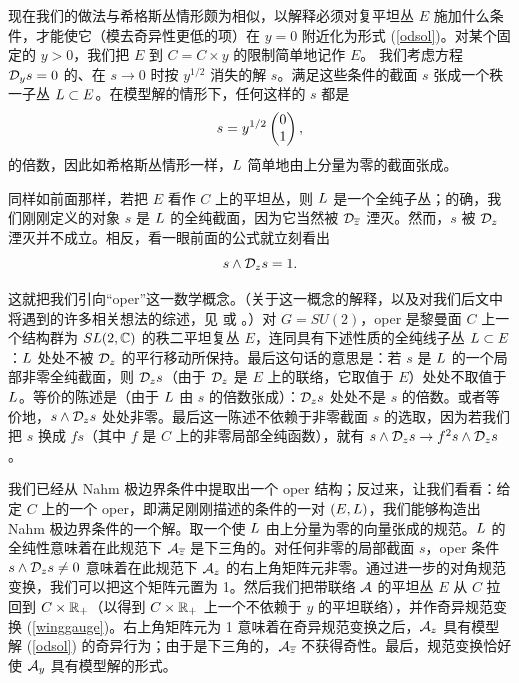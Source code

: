 现在我们的做法与希格斯丛情形颇为相似，以解释必须对复平坦丛 $E$ 施加什么条件，才能使它（模去奇异性更低的项）在 $y=0$ 附近化为形式 (\ref{odsol})。对某个固定的 $y>0$，我们把 $E$ 到 $C=C\times y$ 的限制简单地记作 $E$。
 我们考虑方程 ${\mathcal D}_ys=0$ 的、在 $s\to 0$ 时按 $y^{1/2}$ 消失的解 $s$。满足这些条件的截面 $s$ 张成一个秩一子丛 ${ L}\subset E$。在模型解的情形下，任何这样的 $s$ 都是
\begin{equation}s=y^{1/2}\begin{pmatrix}0 \cr 1\end{pmatrix},\end{equation}
的倍数，因此如希格斯丛情形一样，${ L}$ 简单地由上分量为零的截面张成。

同样如前面那样，若把 $E$ 看作 $C$ 上的平坦丛，则 ${ L}$ 是一个全纯子丛；的确，我们刚刚定义的对象 $s$ 是 ${ L}$ 的全纯截面，因为它当然被 ${\mathcal D}_{\overline z}$ 湮灭。然而，$s$ 被 ${\mathcal D}_z$ 湮灭并不成立。相反，看一眼前面的公式就立刻看出
\begin{equation}\label{tomox}  s\wedge {\mathcal D}_z s = 1.    \end{equation}

这就把我们引向“oper”这一数学概念。（关于这一概念的解释，以及对我们后文中将遇到的许多相关想法的综述，见 \cite{Frenkel} 或 \cite{Teschner}。）对 $G=SU(2)$，oper 是黎曼面 $C$ 上一个结构群为 $SL(2,{\mathbb C})$ 的秩二平坦复丛 $E$，连同具有下述性质的全纯线子丛 ${ L}\subset E$：${ L}$ 处处不被 ${\mathcal D}_z$ 的平行移动所保持。最后这句话的意思是：若 $s$ 是 ${ L}$ 的一个局部非零全纯截面，则 ${\mathcal D}_zs$（由于 ${\mathcal D}_z$ 是 $E$ 上的联络，它取值于 $E$）处处不取值于 ${ L}$。等价的陈述是（由于 ${ L}$ 由 $s$ 的倍数张成）：${\mathcal D}_z s$ 处处不是 $s$ 的倍数。或者等价地，$s\wedge {\mathcal D}_z s$ 处处非零。最后这一陈述不依赖于非零截面 $s$ 的选取，因为若我们把 $s$ 换成 $f s$（其中 $f$ 是 $C$ 上的非零局部全纯函数），就有 $s\wedge {\mathcal D}_zs \to f^2 s\wedge {\mathcal D}_zs$。

我们已经从 Nahm 极边界条件中提取出一个 oper 结构；反过来，让我们看看：给定 $C$ 上的一个 oper，即满足刚刚描述的条件的一对 $(E,{ L})$，我们能够构造出 Nahm 极边界条件的一个解。取一个使 ${ L}$ 由上分量为零的向量张成的规范。${ L}$ 的全纯性意味着在此规范下 ${\mathcal A}_{\overline z}$ 是下三角的。对任何非零的局部截面 $s$，oper 条件 $s\wedge{\mathcal D}_z s\not=0$ 意味着在此规范下 ${\mathcal A}_z$ 的右上角矩阵元非零。通过进一步的对角规范变换，我们可以把这个矩阵元置为 1。然后我们把带联络 ${\mathcal A}$ 的平坦丛 $E$ 从 $C$ 拉回到 $C\times {\mathbb R}_+$（以得到 $C\times{\mathbb R}_+$ 上一个不依赖于 $y$ 的平坦联络），并作奇异规范变换 (\ref{winggauge})。右上角矩阵元为 1 意味着在奇异规范变换之后，${\mathcal A}_z$ 具有模型解 (\ref{odsol}) 的奇异行为；由于是下三角的，${\mathcal A}_{\overline z}$ 不获得奇性。最后，规范变换恰好使 ${\mathcal A}_y$ 具有模型解的形式。

